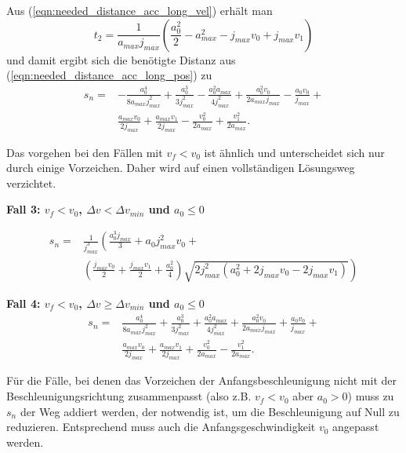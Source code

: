 Aus (\ref{eqn:needed_distance_acc_long_vel}) erhält man 
\begin{equation}
t_2 = \frac{1}{a_{{max}} j_{{max}}} \left(\frac{a_{0}^{2}}{2} - a_{{max}}^{2} - j_{{max}} v_{0} + j_{{max}} v_{1}\right)
\end{equation}
und damit ergibt sich die benötigte Distanz aus (\ref{eqn:needed_distance_acc_long_pos}) zu 
\begin{align}
s_n =& - \frac{a_{0}^{4}}{8 a_{{max}} j_{{max}}^{2}} + \frac{a_{0}^{3}}{3 j_{{max}}^{2}} - \frac{a_{0}^{2} a_{{max}}}{4 j_{{max}}^{2}} + \frac{a_{0}^{2} v_{0}}{2 a_{{max}} j_{{max}}} - \frac{a_{0} v_{0}}{j_{{max}}} + \nonumber \\
 & \frac{a_{{max}} v_{0}}{2 j_{{max}}} + \frac{a_{{max}} v_{1}}{2 j_{{max}}} - \frac{v_{0}^{2}}{2 a_{{max}}} + \frac{v_{1}^{2}}{2 a_{{max}}}.
\end{align}

Das vorgehen bei den Fällen mit $v_f < v_0$ ist ähnlich und unterscheidet sich nur durch einige Vorzeichen. Daher wird auf einen vollständigen Lösungsweg verzichtet. 

\textbf{Fall 3: $v_f < v_0$, $\Delta v < \Delta v_{min}$ und $a_0 \le 0$}

\begin{align}
s_n =& \frac{1}{j_{max}^3} \left( \frac{a_0^3 j_{max}}{3} + a_{0} j_{{max}}^{2} v_{0} + \right. \nonumber \\
     & \left.\left(\frac{j_{{max}} v_{0}}{2} + \frac{j_{{max}} v_{1}}{2} + \frac{a_{0}^{2}}{4}\right) \sqrt{2j_{{max}}^{2} \left(a_{0}^{2} + 2 j_{{max}} v_{0} - 2 j_{{max}} v_{1}\right)}\right) 
\end{align}

\textbf{Fall 4: $v_f < v_0$, $\Delta v \ge \Delta v_{min}$ und $a_0 \le 0$}
\begin{align}
s_n =& \frac{a_{0}^{4}}{8 a_{{max}} j_{{max}}^{2}} + \frac{a_{0}^{3}}{3 j_{{max}}^{2}} + \frac{a_{0}^{2} a_{{max}}}{4 j_{{max}}^{2}} + \frac{a_{0}^{2} v_{0}}{2 a_{{max}} j_{{max}}} + \frac{a_{0} v_{0}}{j_{{max}}} + \nonumber \\
 & \frac{a_{{max}} v_{0}}{2 j_{{max}}} + \frac{a_{{max}} v_{1}}{2 j_{{max}}} + \frac{v_{0}^{2}}{2 a_{{max}}} - \frac{v_{1}^{2}}{2 a_{{max}}}.
\end{align}

Für die Fälle, bei denen das Vorzeichen der Anfangsbeschleunigung nicht mit der Beschleunigungsrichtung zusammenpasst (also z.B. $v_f < v_0$ aber $a_0 > 0$) muss zu $s_n$ der Weg addiert werden, der notwendig ist, um die Beschleunigung auf Null zu reduzieren. Entsprechend muss auch die Anfangsgeschwindigkeit $v_0$ angepasst werden.

